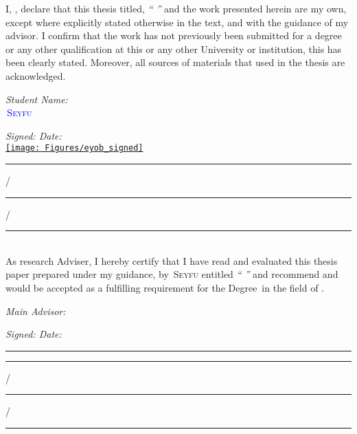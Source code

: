 \documentclass[
12pt, %
oneside, %
english, %
onehalfspacing, %
nolistspacing, %
liststotoc, %
parskip, %
headsepline, %
consistentlayout, %
]{MastersDoctoralThesis} %
\begin{document}
\begin{declaration}
\addchaptertocentry{\authorshipname} %
\noindent I, \authorname, declare that this thesis titled, \emph{\enquote{ \ttitle}} and the work presented herein are my own, except where explicitly stated otherwise in the text, and with the guidance of my advisor. I confirm that the work has not previously been submitted for a degree or any other qualification at this or any other University or institution, this has been clearly stated. Moreover, all sources of materials that used in the thesis are acknowledged.\\[0.5cm] 
\begin{minipage}[t]{0.4\textwidth}
\begin{flushleft} \large
\emph{Student Name: } \\[0.1cm]
\textcolor{blue}{ \authorname\,\textsc{Seyfu}} 
\end{flushleft}
\end{minipage}
\begin{minipage}[t]{0.5\textwidth}
\begin{flushright} \large
\emph{Signed: \hspace{4em} Date: } \\[0.1cm]
\underline{\texttt{[image: Figures/eyob\_signed]}} \hspace{1em} \rule[0em]{1em}{0.5pt} / \rule[0em]{1em}{0.5pt} / \rule[0em]{2em}{0.5pt}
\end{flushright}
\end{minipage}\\[0.5cm] 

As research Adviser, I hereby certify that I have read and evaluated this thesis paper prepared under my guidance, by \authorname\,\textsc{Seyfu} entitled \emph{\enquote{ \ttitle}} and recommend and would be accepted as a fulfilling requirement for the Degree \degreename\,in the field of \groupname.\\[0.5cm]
\begin{minipage}[t]{0.4\textwidth}
\begin{flushleft} \large
\emph{Main Advisor:}\\[0.1cm] 
\href{http://www.aait.edu.et/professor/dr-getachew-alemu}{\supname} 
\end{flushleft}
\end{minipage}
\begin{minipage}[t]{0.5\textwidth}
\begin{flushright} \large
\emph{Signed: \hspace{4em} Date: } \\[0.1cm]
\rule[0em]{4em}{0.5pt} \hspace{1em} \rule[0em]{1em}{0.5pt} / \rule[0em]{1em}{0.5pt} / \rule[0em]{2em}{0.5pt}
\end{flushright}
\end{minipage}\\[1cm]
 

\end{declaration}
\end{document}
